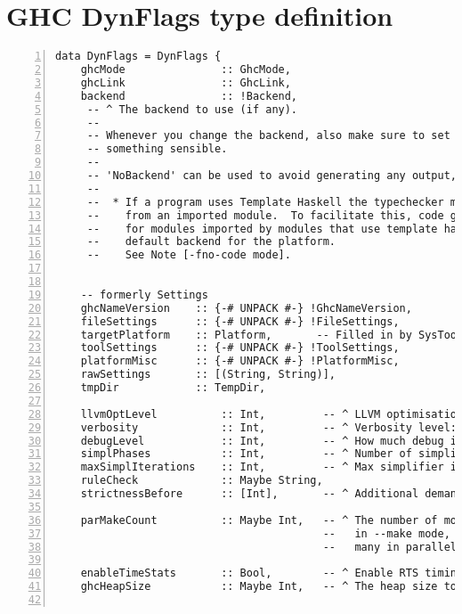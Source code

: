 \documentclass[en]{pracamgr}
\begin{document}
\chapter{GHC DynFlags type definition}
\label{appendix:typedef}
\begin{lstlisting}[numbers=left,stepnumber=1]
  data DynFlags = DynFlags {
    ghcMode               :: GhcMode,
    ghcLink               :: GhcLink,
    backend               :: !Backend,
     -- ^ The backend to use (if any).
     --
     -- Whenever you change the backend, also make sure to set 'ghcLink' to
     -- something sensible.
     --
     -- 'NoBackend' can be used to avoid generating any output, however, note that:
     --
     --  * If a program uses Template Haskell the typechecker may need to run code
     --    from an imported module.  To facilitate this, code generation is enabled
     --    for modules imported by modules that use template haskell, using the
     --    default backend for the platform.
     --    See Note [-fno-code mode].
  
  
    -- formerly Settings
    ghcNameVersion    :: {-# UNPACK #-} !GhcNameVersion,
    fileSettings      :: {-# UNPACK #-} !FileSettings,
    targetPlatform    :: Platform,       -- Filled in by SysTools
    toolSettings      :: {-# UNPACK #-} !ToolSettings,
    platformMisc      :: {-# UNPACK #-} !PlatformMisc,
    rawSettings       :: [(String, String)],
    tmpDir            :: TempDir,
  
    llvmOptLevel          :: Int,         -- ^ LLVM optimisation level
    verbosity             :: Int,         -- ^ Verbosity level: see Note [Verbosity levels]
    debugLevel            :: Int,         -- ^ How much debug information to produce
    simplPhases           :: Int,         -- ^ Number of simplifier phases
    maxSimplIterations    :: Int,         -- ^ Max simplifier iterations
    ruleCheck             :: Maybe String,
    strictnessBefore      :: [Int],       -- ^ Additional demand analysis
  
    parMakeCount          :: Maybe Int,   -- ^ The number of modules to compile in parallel
                                          --   in --make mode, where Nothing ==> compile as
                                          --   many in parallel as there are CPUs.
  
    enableTimeStats       :: Bool,        -- ^ Enable RTS timing statistics?
    ghcHeapSize           :: Maybe Int,   -- ^ The heap size to set.
  

\end{lstlisting}
\end{document}
